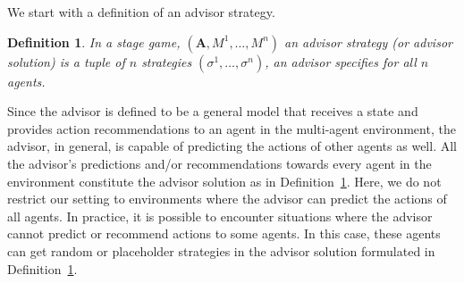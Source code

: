 \documentclass[jair, twoside,11pt,theapa]{article}
\newtheorem{defn}{Definition}
\begin{document}




We start with a definition of an advisor strategy.


\begin{defn}\label{defn:advisorstrategy}
In a stage game, $(\boldsymbol{A}, M^1, \ldots ,M^n)$ an advisor strategy (or advisor solution) is a tuple of $n$ strategies $(\sigma^1, \ldots, \sigma^n)$, an advisor specifies for all $n$ agents.



\end{defn}






Since the advisor is defined to be a general model that receives a state and provides action recommendations to an agent in the multi-agent environment, the advisor, in general, is capable of predicting the actions of other agents as well. All the advisor's predictions and/or recommendations towards every agent in the environment constitute the advisor solution as in Definition~\ref{defn:advisorstrategy}. Here, we do not restrict our setting to environments where the advisor can predict the actions of all agents. In practice, it is possible to encounter situations where the advisor cannot predict or recommend actions to some agents. In this case, these agents can get random or placeholder strategies in the advisor solution formulated in Definition~\ref{defn:advisorstrategy}. 
\end{document}
